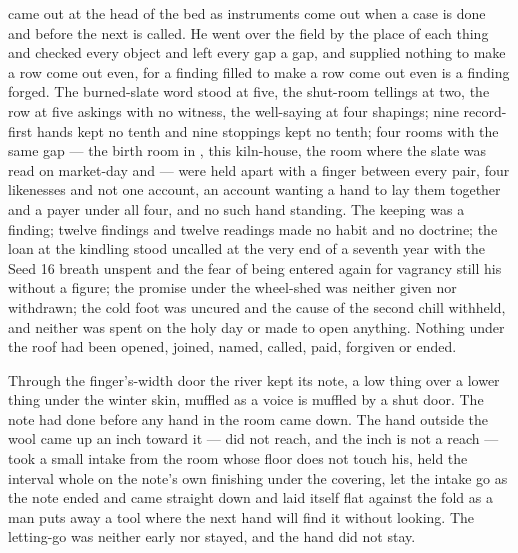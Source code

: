  came out at the head of the bed as instruments come out when a case is done and before the next is called. He went over the field by the place of each thing and checked every object and left every gap a gap, and supplied nothing to make a row come out even, for a finding filled to make a row come out even is a finding forged. The burned-slate word stood at five, the shut-room tellings at two, the row at five askings with no witness, the well-saying at four shapings; nine record-first hands kept no tenth and nine stoppings kept no tenth; four rooms with the same gap --- the birth room in , this kiln-house, the room where the slate was read on market-day and  --- were held apart with a finger between every pair, four likenesses and not one account, an account wanting a hand to lay them together and a payer under all four, and no such hand standing. The keeping was a finding; twelve findings and twelve readings made no habit and no doctrine; the loan at the kindling stood uncalled at the very end of a seventh year with the Seed 16 breath unspent and the fear of being entered again for vagrancy still his without a figure; the promise under the wheel-shed was neither given nor withdrawn; the cold foot was uncured and the cause of the second chill withheld, and neither was spent on the holy day or made to open anything. Nothing under the roof had been opened, joined, named, called, paid, forgiven or ended.

Through the finger's-width door the river kept its note, a low thing over a lower thing under the winter skin, muffled as a voice is muffled by a shut door. The note had done before any hand in the room came down. The hand outside the wool came up an inch toward it --- did not reach, and the inch is not a reach --- took a small intake from the room whose floor does not touch his, held the interval whole on the note's own finishing under the covering, let the intake go as the note ended and came straight down and laid itself flat against the fold as a man puts away a tool where the next hand will find it without looking. The letting-go was neither early nor stayed, and the hand did not stay.

